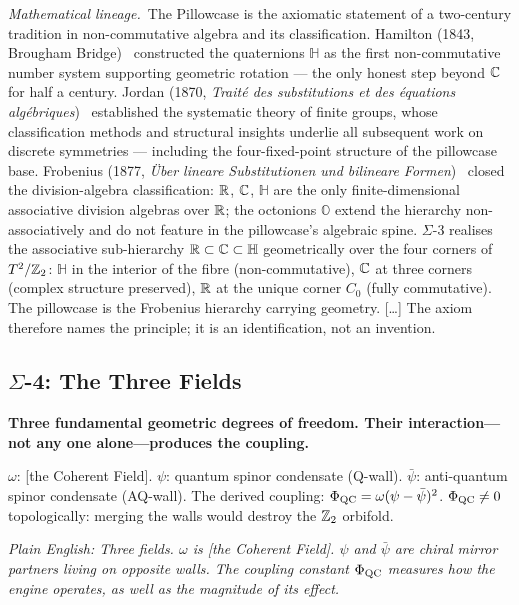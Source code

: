 \noindent\emph{Mathematical lineage.}\ The Pillowcase is the axiomatic statement of a two-century tradition in non-commutative algebra and its classification.  Hamilton (1843, Brougham Bridge)~\cite{Hamilton1844} constructed the quaternions $\mathbb{H}$ as the first non-commutative number system supporting geometric rotation --- the only honest step beyond $\mathbb{C}$ for half a century.  Jordan (1870, \emph{Trait\'{e} des substitutions et des \'{e}quations alg\'{e}briques})~\cite{Jordan1870} established the systematic theory of finite groups, whose classification methods and structural insights underlie all subsequent work on discrete symmetries --- including the four-fixed-point structure of the pillowcase base.  Frobenius (1877, \emph{\"{U}ber lineare Substitutionen und bilineare Formen})~\cite{Frobenius1877} closed the division-algebra classification: $\mathbb{R}$, $\mathbb{C}$, $\mathbb{H}$ are the only finite-dimensional associative division algebras over $\mathbb{R}$; the octonions $\mathbb{O}$ extend the hierarchy non-associatively and do not feature in the pillowcase's algebraic spine.  $\Sigma$-3 realises the associative sub-hierarchy $\mathbb{R} \subset \mathbb{C} \subset \mathbb{H}$ geometrically over the four corners of $T^2/\mathbb{Z}_2$: $\mathbb{H}$ in the interior of the fibre (non-commutative), $\mathbb{C}$ at three corners (complex structure preserved), $\mathbb{R}$ at the unique corner $C_0$ (fully commutative).  The pillowcase is the Frobenius hierarchy carrying geometry. [\ldots]  The axiom therefore names the principle; it is an identification, not an invention.

\subsection*{$\Sigma$-4: The Three Fields}
\par\smallskip
\textbf{Three fundamental geometric degrees of freedom.  Their interaction---not any one alone---produces the coupling.}

$\omega$: [the Coherent Field].  $\psi$: quantum spinor condensate (Q-wall).  $\bar{\psi}$: anti-quantum spinor condensate (AQ-wall).  The derived coupling: $\Phi_{\mathrm{QC}} = \omega(\psi - \bar{\psi})^2$.  $\Phi_{\mathrm{QC}} \neq 0$ topologically: merging the walls would destroy the $\mathbb{Z}_2$ orbifold.

\emph{Plain English: Three fields.  $\omega$ is [the Coherent Field].  $\psi$ and $\bar{\psi}$ are chiral mirror partners living on opposite walls.  The coupling constant $\Phi_{\mathrm{QC}}$ measures how the engine operates, as well as the magnitude of its effect.}


